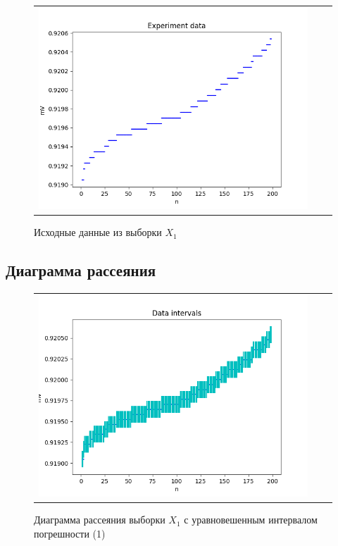 \documentclass[a4paper,14pt]{article}
\begin{document}
		\begin{figure}[H]
			\begin{center}
			\begin{tabular}{ccc}
				\includegraphics[scale=0.8]{../image/data.png}
			\end{tabular}
		\end{center}
			\caption{Исходные данные из выборки $X_1$} 
		\end{figure}
	 \subsection{Диаграмма рассеяния}
	\begin{figure}[H]
		\begin{center}
			\begin{tabular}{ccc}
				\includegraphics[scale=0.8]{../image/data_and_intervals1.png}
			\end{tabular}
		\end{center}
		\caption{Диаграмма рассеяния выборки $X_1$ с уравновешенным интервалом погрешности (1)} 
	\end{figure}
\end{document}

